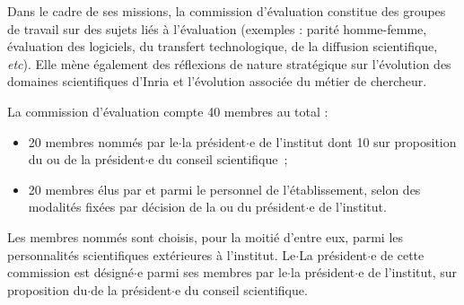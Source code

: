 Dans le cadre de ses missions, la commission d'\'evaluation constitue des groupes de travail sur des sujets li\'es \`a l'\'evaluation (exemples : parit\'e homme-femme, \'evaluation des logiciels, du transfert technologique, de la diffusion scientifique, {\it etc}). Elle m\`ene \'egalement des r\'eflexions de nature strat\'egique sur l'\'evolution des domaines scientifiques d'Inria et l'\'evolution associ\'ee du m\'etier de chercheur.

La commission d'\'evaluation compte 40 membres au total :
\begin{itemize}
\item 20 membres nomm\'es par le$\cdot$la pr\'esident$\cdot$e de l'institut dont 10 sur proposition du ou de la pr\'esident$\cdot$e du conseil scientifique~;
\item 20 membres \'elus par et parmi le personnel de l'\'etablissement, selon des modalit\'es fix\'ees
par d\'ecision de la ou du pr\'esident$\cdot$e de l'institut.
\end{itemize}
Les membres nomm\'es sont choisis, pour la moiti\'e d'entre eux, parmi les personnalit\'es scientifiques
ext\'erieures \`a l'institut. Le$\cdot$La pr\'esident$\cdot$e de cette commission est d\'esign\'e$\cdot$e parmi ses membres par le$\cdot$la
 pr\'esident$\cdot$e de l'institut, sur proposition du$\cdot$de la pr\'esident$\cdot$e du conseil scientifique.  
 
